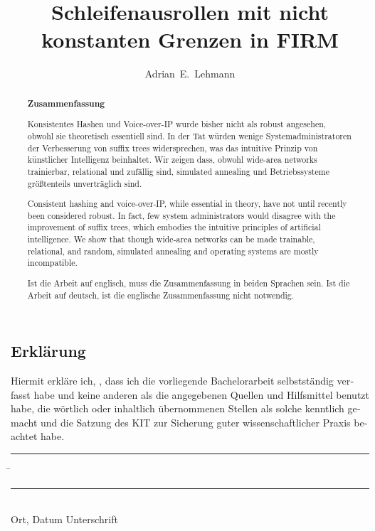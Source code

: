 \documentclass[parskip=no,12pt,a4paper,twoside,headings=openright]{scrreprt}
\title{Schleifenausrollen mit nicht konstanten Grenzen in FIRM}
\author{Adrian~E.~Lehmann}
\begin{document}

\begin{otherlanguage}{ngerman} %
\mytitlepage
\end{otherlanguage}

\begin{abstract}
\begin{center}\Huge\textbf{\textsf{Zusammenfassung}}
\end{center}
\vfill

Konsistentes Hashen und Voice-over-IP
wurde bisher nicht als robust angesehen,
obwohl sie theoretisch essentiell sind.
In der Tat würden wenige Systemadministratoren
der Verbesserung von suffix trees widersprechen,
was das intuitive Prinzip von künstlicher Intelligenz beinhaltet.
Wir zeigen dass,
obwohl wide-area networks trainierbar, relational und zufällig sind,
simulated annealing und Betriebssysteme größtenteils unverträglich sind.
\vfill

Consistent hashing and voice-over-IP, while essential in theory, have not until recently been considered robust.
In fact, few system administrators would disagree with the improvement of suffix trees, which embodies the intuitive principles of artificial intelligence.
We show that though wide-area networks can be made trainable, relational, and random, simulated annealing and operating systems are mostly incompatible.
\vfill

Ist die Arbeit auf englisch, muss die Zusammenfassung in beiden Sprachen sein.
Ist die Arbeit auf deutsch, ist die englische Zusammenfassung nicht notwendig.
\end{abstract}

\tableofcontents










\begin{otherlanguage}{ngerman}
\chapter*{Erklärung}
\pagestyle{empty}

  \vspace{20mm}
  Hiermit erkläre ich, \theauthor, dass ich die vorliegende Bachelorarbeit selbst\-ständig
verfasst habe und keine anderen als die angegebenen Quellen und Hilfsmittel
benutzt habe, die wörtlich oder inhaltlich übernommenen Stellen als solche kenntlich gemacht und
die Satzung des KIT zur Sicherung guter wissenschaftlicher Praxis beachtet habe.
  \vspace{20mm}
  \begin{tabbing}
  \rule{4cm}{.4pt}\hspace{1cm} \= \rule{7cm}{.4pt} \\
 Ort, Datum \> Unterschrift
  \end{tabbing}
\end{otherlanguage}


\pagestyle{fancy}
\appendix


\end{document}
